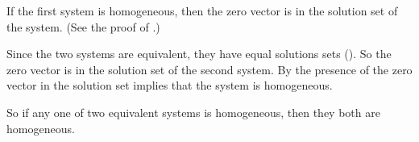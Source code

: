 If the first system is homogeneous, then the zero vector is in the solution set of the system.  (See the proof of .)\par
%
Since the two systems are equivalent, they have equal solutions sets ().  So the zero vector is in the solution set of the second system.  By  the presence of the zero vector in the solution set implies that the system is homogeneous.\par
%
So if any one of two equivalent systems is homogeneous, then they both are homogeneous.